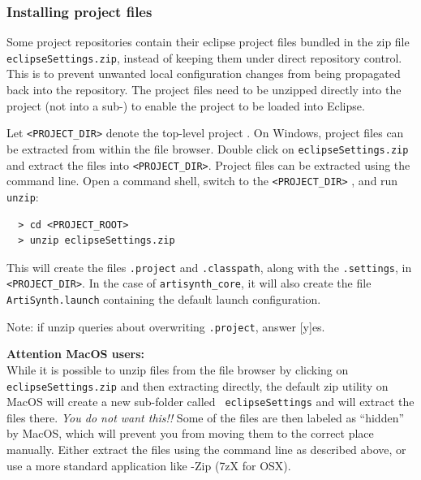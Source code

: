 \subsubsection{Installing project files}
\label{installingProjectFiles}

Some project repositories contain their eclipse project files bundled
in the zip file {\tt eclipseSettings.zip}, instead of keeping them
under direct repository control. This is to prevent unwanted local
configuration changes from being propagated back into the repository.
The project files need to be unzipped directly into the project
\directory{} (not into a sub-\directory{}) to enable the project to be
loaded into Eclipse.

Let {\tt <PROJECT\_DIR>} denote the top-level project \directory{}.
%
\ifWindows
On Windows, project files can be extracted from within the 
file browser. Double click on {\tt eclipseSettings.zip}
and extract the files into {\tt <PROJECT\_DIR>}.
\else %
Project files can be extracted using the command line.
Open a command shell, 
switch to the {\tt <PROJECT\_DIR>} \directory{}, and run {\tt unzip}:
\begin{verbatim}
  > cd <PROJECT_ROOT>
  > unzip eclipseSettings.zip
\end{verbatim}
\fi %
This will create the files {\tt .project} and {\tt .classpath}, along
with the \directory{} {\tt .settings}, in {\tt <PROJECT\_DIR>}.  In
the case of {\tt artisynth\_core}, it will also create the file {\tt
ArtiSynth.launch} containing the default launch configuration.

\begin{sideblock}
Note: if unzip queries about overwriting {\tt .project}, answer [y]es.
\end{sideblock}

\ifMacOS
\begin{sideblock}
{\bf Attention MacOS users:}\\[0.5em]
While it is possible to unzip files from the file browser by clicking
on {\tt eclipseSettings.zip} and then extracting directly, the default
zip utility on MacOS will create a new sub-folder called {\tt
eclipseSettings} and will extract the files there.
\emph{You do not want this!!}
Some of the files are then labeled as ``hidden'' by MacOS, which will
prevent you from moving them to the correct place manually. 
Either extract the files using the command line as described
above, or use a more standard application like {-Zip} ({\sf 7zX} for OSX).
\end{sideblock}
\fi %

